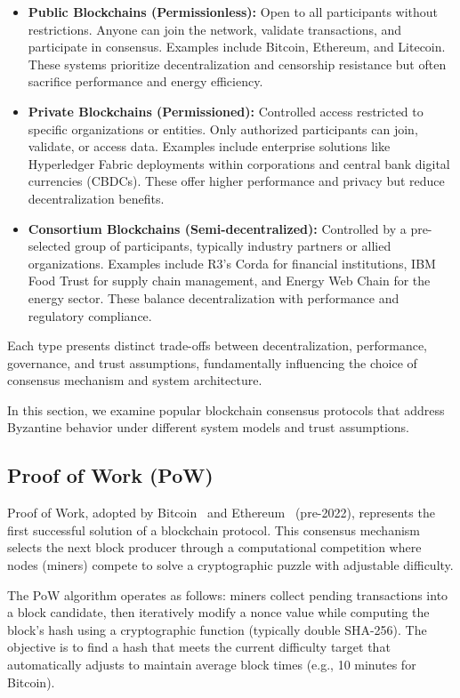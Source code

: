 \begin{itemize}
  \item \textbf{Public Blockchains (Permissionless):} Open to all participants without restrictions.
  Anyone can join the network, validate transactions, and participate in consensus. Examples include
  Bitcoin, Ethereum, and Litecoin. These systems prioritize decentralization and censorship resistance
  but often sacrifice performance and energy efficiency.
  
  \item \textbf{Private Blockchains (Permissioned):} Controlled access restricted to specific
  organizations or entities. Only authorized participants can join, validate, or access data.
  Examples include enterprise solutions like Hyperledger Fabric deployments within corporations
  and central bank digital currencies (CBDCs). These offer higher performance and privacy
  but reduce decentralization benefits.
  
  \item \textbf{Consortium Blockchains (Semi-decentralized):} Controlled by a pre-selected group
  of participants, typically industry partners or allied organizations. Examples include
  R3's Corda for financial institutions, IBM Food Trust for supply chain management,
  and Energy Web Chain for the energy sector. These balance decentralization with performance
  and regulatory compliance.
\end{itemize}

Each type presents distinct trade-offs between decentralization, performance, governance,
and trust assumptions, fundamentally influencing the choice of consensus mechanism and
system architecture.

In this section, we examine popular blockchain consensus protocols that address Byzantine
behavior under different system models and trust assumptions.

\subsection{Proof of Work (PoW)}\label{sub:pow}

Proof of Work, adopted by Bitcoin~\cite{bitcoin} and Ethereum~\cite{ethereum} (pre-2022),
represents the first successful solution of a blockchain protocol.
This consensus mechanism selects the next block producer through a computational
competition where nodes (miners) compete to solve a cryptographic puzzle with
adjustable difficulty.

The PoW algorithm operates as follows: miners collect pending transactions into a block
candidate, then iteratively modify a nonce value while computing the block's hash
using a cryptographic function (typically double SHA-256). The objective is to find
a hash that meets the current difficulty target that automatically adjusts to
maintain average block times (e.g., 10 minutes for Bitcoin).

